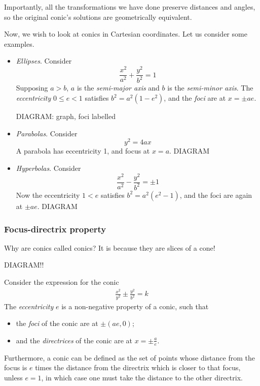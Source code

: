 \documentclass{../../template/note}
\begin{document}
    Importantly, all the transformations we have done preserve distances and angles, so the original conic's solutions are geometrically equivalent.

    Now, we wish to look at conics in Cartesian coordinates. Let us consider some examples.

    \begin{itemize}
        \item \emph{Ellipses}. Consider
        \[
            \frac{x^2}{a^2} + \frac{y^2}{b^2} = 1
        \]
        Supposing \(a > b\), \(a\) is the \emph{semi-major axis} and \(b\) is the \emph{semi-minor axis}. The \emph{eccentricity} \(0 \leq e < 1\) satisfies \(b^2 = a^2(1-e^2)\), and the \emph{foci} are at \(x = \pm ae\). 

        DIAGRAM: graph, foci labelled
        \item \emph{Parabolas}. Consider
        \[
            y^2 = 4ax
        \]
        A parabola has eccentricity 1, and focus at \(x=a\).
        DIAGRAM
        \item \emph{Hyperbolas}. Consider
        \[
            \frac{x^2}{a^2} - \frac{y^2}{b^2} = \pm 1
        \]
        Now the eccentricity \(1 < e\) satisfies \(b^2 = a^2(e^2-1)\), and the foci are again at \(\pm ae\).
        DIAGRAM
    \end{itemize}
    

    \subsubsection{Focus-directrix property}

    Why are conics called conics? It is because they are slices of a cone!

    DIAGRAM!!

    
    \begin{definition}
        Consider the expression for the conic
        \begin{align*}
            \frac{x^2}{y^2} \pm \frac{y^2}{b^2} = k
        \end{align*}
        The \emph{eccentricity} \(e\) is a non-negative property of a conic, such that
        \begin{itemize}
            \item the \emph{foci} of the conic are at \(\pm (ae, 0)\);
            \item and the \emph{directrices} of the conic are at \(x = \pm \frac a e\).
        \end{itemize}
        Furthermore, a conic can be defined as the set of points whose distance from the focus is \(e\) times the distance from the directrix which is closer to that focus, unless \(e=1\), in which case one must take the distance to the other directrix.        
    \end{definition}
    
\end{document}
